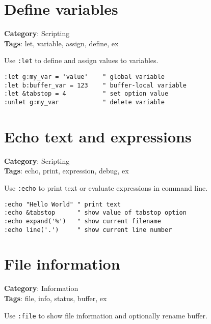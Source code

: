 {{{{{{\section{Define variables}

\textbf{Category}: Scripting\\ \textbf{Tags}: let, variable, assign, define, ex
\vspace{0.5cm}

Use {\footnotesize \Verb§:let§} to define and assign values to variables.

\begin{Exa*}{}
\begin{Verbatim}[fontsize=\footnotesize, breaklines, breakanywhere]
:let g:my_var = 'value'    " global variable
:let b:buffer_var = 123    " buffer-local variable
:let &tabstop = 4          " set option value
:unlet g:my_var            " delete variable
\end{Verbatim}
\end{Exa*}

\section{Echo text and expressions}

\textbf{Category}: Scripting\\ \textbf{Tags}: echo, print, expression, debug, ex
\vspace{0.5cm}

Use {\footnotesize \Verb§:echo§} to print text or evaluate expressions in command line.

\begin{Exa*}{}
\begin{Verbatim}[fontsize=\footnotesize, breaklines, breakanywhere]
:echo "Hello World" " print text
:echo &tabstop      " show value of tabstop option
:echo expand('%')   " show current filename
:echo line('.')     " show current line number
\end{Verbatim}
\end{Exa*}

\section{File information}

\textbf{Category}: Information\\ \textbf{Tags}: file, info, status, buffer, ex
\vspace{0.5cm}

Use {\footnotesize \Verb§:file§} to show file information and optionally rename buffer.

}}}}}}
